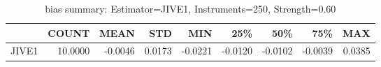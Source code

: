 \begin{table}[ht]
\centering
\caption{bias summary: Estimator=JIVE1, Instruments=250, Strength=0.60}
\begin{tabular}{lrrrrrrrr}
\toprule
 & COUNT & MEAN & STD & MIN & 25\% & 50\% & 75\% & MAX \\
\midrule
JIVE1 & 10.0000 & -0.0046 & 0.0173 & -0.0221 & -0.0120 & -0.0102 & -0.0039 & 0.0385 \\
\bottomrule
\end{tabular}
\end{table}
